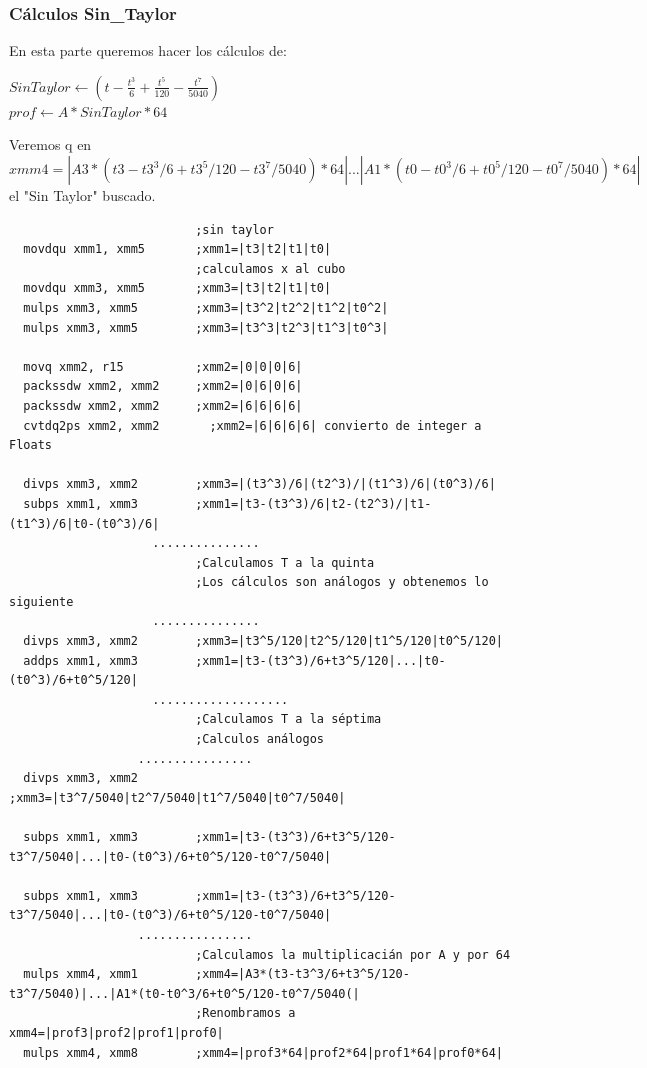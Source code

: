 \subsubsection*{Cálculos Sin_Taylor}
En esta parte queremos hacer los cálculos de:
\begin{center}
	$SinTaylor \gets (t - \frac{t^3}{6}+\frac{t^5}{120}-\frac{t^7}{5040})$ \\
	$prof \gets A * SinTaylor*64$
\end{center}
Veremos q en $xmm4=|A3*(t3-t3^3/6+t3^5/120-t3^7/5040)*64|...|A1*(t0-t0^3/6+t0^5/120-t0^7/5040)*64|$ el "Sin Taylor" buscado.
\begin{codesnippet}
\begin{verbatim}
                          ;sin taylor
  movdqu xmm1, xmm5       ;xmm1=|t3|t2|t1|t0|
                          ;calculamos x al cubo
  movdqu xmm3, xmm5       ;xmm3=|t3|t2|t1|t0|
  mulps xmm3, xmm5        ;xmm3=|t3^2|t2^2|t1^2|t0^2|
  mulps xmm3, xmm5        ;xmm3=|t3^3|t2^3|t1^3|t0^3|	

  movq xmm2, r15          ;xmm2=|0|0|0|6|
  packssdw xmm2, xmm2     ;xmm2=|0|6|0|6|
  packssdw xmm2, xmm2     ;xmm2=|6|6|6|6|
  cvtdq2ps xmm2, xmm2	    ;xmm2=|6|6|6|6| convierto de integer a Floats

  divps xmm3, xmm2        ;xmm3=|(t3^3)/6|(t2^3)/|(t1^3)/6|(t0^3)/6|
  subps xmm1, xmm3        ;xmm1=|t3-(t3^3)/6|t2-(t2^3)/|t1-(t1^3)/6|t0-(t0^3)/6|
                    ...............                  
                          ;Calculamos T a la quinta
                          ;Los cálculos son análogos y obtenemos lo siguiente
                    ...............
  divps xmm3, xmm2        ;xmm3=|t3^5/120|t2^5/120|t1^5/120|t0^5/120|								
  addps xmm1, xmm3        ;xmm1=|t3-(t3^3)/6+t3^5/120|...|t0-(t0^3)/6+t0^5/120|								
                    ................... 
                          ;Calculamos T a la séptima
                          ;Calculos análogos
                  ................	
  divps xmm3, xmm2        ;xmm3=|t3^7/5040|t2^7/5040|t1^7/5040|t0^7/5040|
                  
  subps xmm1, xmm3        ;xmm1=|t3-(t3^3)/6+t3^5/120-t3^7/5040|...|t0-(t0^3)/6+t0^5/120-t0^7/5040|

  subps xmm1, xmm3        ;xmm1=|t3-(t3^3)/6+t3^5/120-t3^7/5040|...|t0-(t0^3)/6+t0^5/120-t0^7/5040|								
                  ................
                          ;Calculamos la multiplicacián por A y por 64
  mulps xmm4, xmm1        ;xmm4=|A3*(t3-t3^3/6+t3^5/120-t3^7/5040)|...|A1*(t0-t0^3/6+t0^5/120-t0^7/5040(|
                          ;Renombramos a xmm4=|prof3|prof2|prof1|prof0|		
  mulps xmm4, xmm8        ;xmm4=|prof3*64|prof2*64|prof1*64|prof0*64|

\end{verbatim}
\end{codesnippet}

